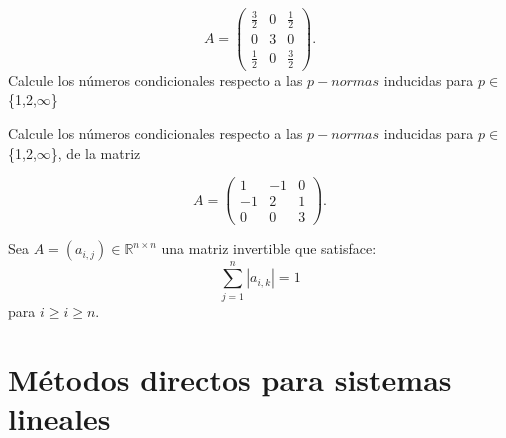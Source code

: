\documentclass[12pt]{book}
\newcommand{\R}{\mathbb{R}}
\newcommand\abs[1]{\left\lvert#1\right\rvert}
\begin{document}
\[
A=  \begin{pmatrix}
        \frac{3}{2} & 0 & \frac{1}{2}\\
        0 & 3 & 0\\
        \frac{1}{2} & 0 & \frac{3}{2}
    \end{pmatrix}.
\]
Calcule los números condicionales respecto a las $p-normas$ inducidas para $p\in$ \{1,2,$\infty$\}

\eje Calcule los números condicionales respecto a las $p-normas$ inducidas para $p\in$ \{1,2,$\infty$\}, de la matriz

\[
A=  \begin{pmatrix}
        1 & -1 & 0\\
        -1 & 2 & 1\\
        0 & 0 & 3
    \end{pmatrix}.
\]


\eje Sea $A=(a_{i,j})\in \R^{n \times n}$ una matriz invertible que satisface:
\[\sum_{j=1}^n\abs{a_{i,k}}=1\]
para  $i\geq i\geq n$.



\chapter{Métodos directos para sistemas lineales}
\end{document}
